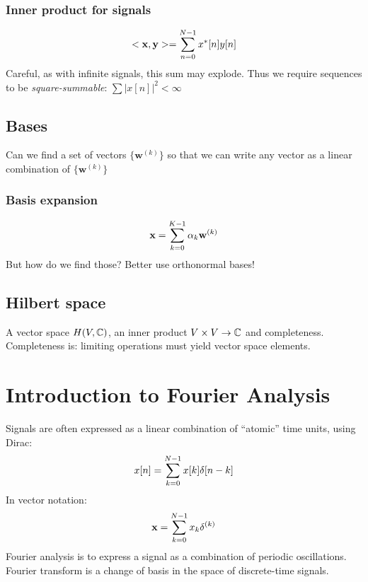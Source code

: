 \documentclass[11pt,a4paper]{article}
\numberwithin{equation}{section}
\begin{document}
\subsubsection{Inner product for signals}
\begin{equation}
    <\mathbf{x,y}> = \somme{N-1}{n=0} x^*[n]y[n]
\end{equation}
Careful, as with infinite signals, this sum may explode. Thus we require sequences to be \textit{square-summable}: $\sum |x[n]|^2 < \infty$
\subsection{Bases}
Can we find a set of vectors $\{\mathbf{w}^{(k)}\}$ so that we can write any vector as a linear combination of $\{\mathbf{w}^{(k)}\}$
\subsubsection{Basis expansion}
\begin{equation}
    \mathbf{x} = \somme{K-1}{k=0}\alpha_k \mathbf{w}^{(k)}
\end{equation}
But how do we find those? Better use orthonormal bases!

\subsection{Hilbert space}
A vector space $H(V,\C)$, an inner product $V\times V \to \C$ and completeness. Completeness is: limiting operations must yield vector space elements.

\section{Introduction to Fourier Analysis}
Signals are often expressed as a linear combination of ``atomic'' time units, using Dirac:
\begin{equation}
    x[n] = \somme{N-1}{k=0}x[k]\delta[n-k]
\end{equation}
In vector notation: 
\begin{equation}
    \mathbf{x} = \somme{N-1}{k=0}x_k\mathbb{\delta}^{(k)}
\end{equation}
Fourier analysis is to express a signal as a combination of periodic oscillations. Fourier transform is a change of basis in the space of discrete-time signals. 
\end{document}
